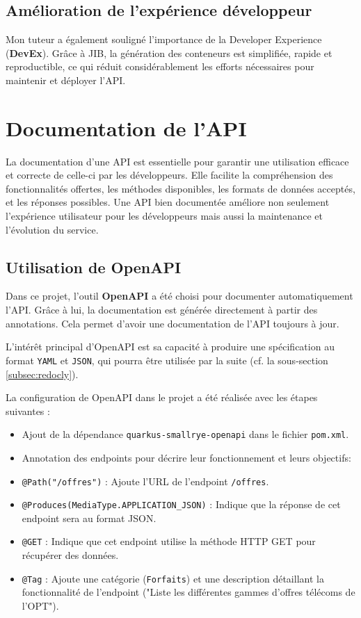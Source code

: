 \documentclass{article}
\begin{document}
	\subsection{Amélioration de l'expérience développeur}
	
	Mon tuteur a également souligné l'importance de la Developer Experience (\textbf{DevEx}). Grâce à JIB, la génération des conteneurs est simplifiée, rapide et reproductible, ce qui réduit considérablement les efforts nécessaires pour maintenir et déployer l'API.
	
	\section{Documentation de l'API}
	
	La documentation d'une API est essentielle pour garantir une utilisation efficace et correcte de celle-ci par les développeurs. Elle facilite la compréhension des fonctionnalités offertes, les méthodes disponibles, les formats de données acceptés, et les réponses possibles. Une API bien documentée améliore non seulement l'expérience utilisateur pour les développeurs mais aussi la maintenance et l'évolution du service.
	
	\subsection{Utilisation de OpenAPI}
	
	Dans ce projet, l'outil \textbf{OpenAPI} a été choisi pour documenter automatiquement l'API. Grâce à lui, la documentation est générée directement à partir des annotations. Cela permet d'avoir une documentation de l'API toujours à jour. 
	
	L'intérêt principal d'OpenAPI est sa capacité à produire une spécification au format \texttt{YAML} et \texttt{JSON}, qui pourra être utilisée par la suite (cf. la sous-section \ref{subsec:redocly}).
	
	La configuration de OpenAPI dans le projet a été réalisée avec les étapes suivantes :
	\begin{itemize}
		\item Ajout de la dépendance \texttt{quarkus-smallrye-openapi} dans le fichier \texttt{pom.xml}.
		\item Annotation des endpoints pour décrire leur fonctionnement et leurs objectifs:
	\end{itemize}
		
	\begin{itemize}
		\item \texttt{@Path("/offres")} : Ajoute l'URL de l'endpoint \texttt{/offres}.
		\item \texttt{@Produces(MediaType.APPLICATION\_JSON)} : Indique que la réponse de cet endpoint sera au format JSON.
		\item \texttt{@GET} : Indique que cet endpoint utilise la méthode HTTP GET pour récupérer des données.
		\item \texttt{@Tag} : Ajoute une catégorie (\texttt{Forfaits}) et une description détaillant la fonctionnalité de l'endpoint ("Liste les différentes gammes d'offres télécoms de l'OPT").
	\end{itemize}
\end{document}
